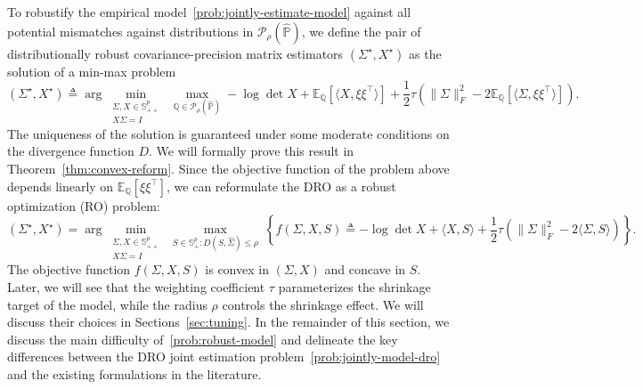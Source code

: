 \documentclass[11pt]{article}
\def\P{\mathbb{P}}
\def\S{\mathbb{S}}
\def\la{\langle}
\def\PSD{{\S^k_{++}}}
\def\ra{\rangle}
\newcommand{\opt}{^\star}
\newcommand{\Let}{\triangleq}
\def\transpose{\top}
\def\P{\mathbb{P}}
\def\S{\mathbb{S}}
\def\E {\mathbb{E}}
\def\la{\langle}
\def\PSD{{\S^p_{+}}}
\def\PD{{\S^p_{++}}}
\def\ra{\rangle}
\newcommand{\wh}{\widehat}
\begin{document}
To robustify the empirical model~\eqref{prob:jointly-estimate-model} against all potential mismatches against distributions in $\mathcal{P}_\rho (\wh{\P})$, we define the pair of distributionally robust covariance-precision matrix estimators $(\Sigma\opt, X\opt)$ as the solution of a min-max problem
\begin{equation}
    (\Sigma\opt, X\opt) \Let \arg\min\limits_{\substack{\Sigma,X \in \PD \\ X \Sigma = I}}\;\max\limits_{\mathbb{Q}\in \mathcal{P}_ \rho(\wh{\P})}  -\log\det X+\E_{{\mathbb{Q}}}[\la X,\xi\xi^\transpose\ra] +\frac{1}{2}\tau \left(\|\Sigma\|_F^2-2\E_{{\mathbb{Q}}}[\la \Sigma, \xi \xi^\transpose\ra]\right). \tag{DRO}
    \label{prob:jointly-model-dro}
\end{equation}
The uniqueness of the solution is guaranteed under some moderate conditions on the divergence function $D$. We will formally prove this result in Theorem~\ref{thm:convex-reform}.
Since the objective function of the problem above depends linearly on $\E_{\mathbb{Q}}[\xi\xi^\transpose]$, we can reformulate the DRO as a robust optimization (RO) problem:
\begin{equation}\label{prob:robust-model}
    \displaystyle (\Sigma\opt, X\opt) = \arg\min_{\substack{\Sigma,X \in \PD \\ X \Sigma = I}} ~\max\limits_{S \in \PSD: D(S, \widehat{\Sigma})\leq  \rho}~\left\{ f(\Sigma, X, S) \triangleq -\log\det X+\la X,S\ra +\frac{1}{2}\tau \left(\|\Sigma\|_F^2-2\la \Sigma, S\ra\right) \right\}. \tag{RO}
\end{equation}
The objective function $f(\Sigma, X, S)$ is convex in $(\Sigma, X)$ and concave in $S$. 
Later, we will see that the weighting coefficient $\tau$ parameterizes the shrinkage target of the model, while the radius $\rho$ controls the shrinkage effect. We will discuss their choices in Sections~\ref{sec:tuning}.
In the remainder of this section, we discuss the main difficulty of~\eqref{prob:robust-model} and delineate the key differences between the DRO joint estimation problem~\eqref{prob:jointly-model-dro} and the existing formulations in the literature.
\end{document}
